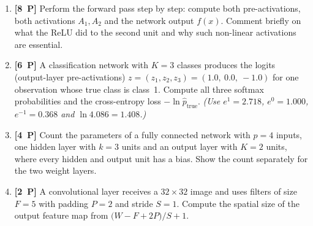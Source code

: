 \documentclass[11pt,a4paper]{article}
\newcommand{\pp}[1]{\textbf{[#1~P]}\enspace}
\begin{document}
\begin{enumerate}[label=(\alph*),leftmargin=7mm,itemsep=2.5mm]
  \item \pp{8} Perform the forward pass step by step: compute both pre-activations, both
    activations $A_1,A_2$ and the network output $f(x)$. Comment briefly on what the ReLU did
    to the second unit and why such non-linear activations are essential.
  \item \pp{6} A classification network with $K=3$ classes produces the logits (output-layer
    pre-activations) $z=(z_1,z_2,z_3)=(1.0,\ 0.0,\ -1.0)$ for one observation whose true class
    is class~1. Compute all three softmax probabilities and the cross-entropy loss
    $-\ln \hat{p}_{\text{true}}$.
    \emph{(Use $e^{1}=2.718$, $e^{0}=1.000$, $e^{-1}=0.368$ and $\ln 4.086=1.408$.)}
  \item \pp{4} Count the parameters of a fully connected network with $p=4$ inputs, one hidden
    layer with $k=3$ units and an output layer with $K=2$ units, where every hidden and output
    unit has a bias. Show the count separately for the two weight layers.
  \item \pp{2} A convolutional layer receives a $32\times 32$ image and uses filters of size
    $F=5$ with padding $P=2$ and stride $S=1$. Compute the spatial size of the output feature
    map from $\bigl(W-F+2P\bigr)/S+1$.
\end{enumerate}
\end{document}
